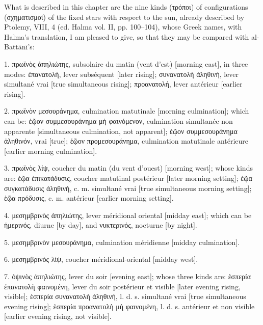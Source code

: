 \documentclass[11pt]{article}
\newcommand{\Pg}[1]{\marginpar{\footnotesize\color{gray}#1}}
\begin{document}
\par What is described in this chapter are the nine kinds ({\greekfont τρόποι}) of configurations ({\greekfont σχηματισμοί}) of the fixed stars with respect to the sun, already described by Ptolemy, VIII, 4 (ed. Halma vol. II, pp. 100–104), whose Greek names, with Halma's translation, I am pleased to give, so that they may be compared with al-Battānī's:\par
\par 1. {\greekfont πρωϊνὸς ἀπηλιώτης}, subsolaire du matin (vent d’est) [morning east], in three modes: {\greekfont ἐπανατολή}, lever subséquent [later rising]; {\greekfont συνανατολὴ ἀληθινή}, lever simultané vrai [true simultaneous rising]; {\greekfont προανατολή}, lever antérieur [earlier rising].\par
\par 2. {\greekfont πρωϊνὸν μεσουράνημα}, culmination matutinale [morning culmination]; which can be: {\greekfont ἑῷον συμμεσουράνημα μὴ φαινόμενον}, culmination simultanée non apparente [simultaneous culmination, not apparent]; {\greekfont ἑῷον συμμεσουράνημα ἀληθινόν}, vrai [true]; {\greekfont ἑῷον προμεσουράνημα}, culmination matutinale antérieure [earlier morning culmination].\par
\par 3. {\greekfont πρωϊνὸς λίψ}, coucher du matin (du vent d’ouest) [morning west]; whose kinds are: {\greekfont ἑῷα ἐπικατάδυσις}, coucher matutinal postérieur [later morning setting]; {\greekfont ἑῷα συγκατάδυσις ἀληθινή}, c. m. simultané vrai [true simultaneous morning setting]; {\greekfont ἑῷα πρόδυσις}, c. m. antérieur [earlier morning setting].\par
\par 4. {\greekfont μεσημβρινὸς ἀπηλιώτης}, lever méridional oriental [midday east]; which can be {\greekfont ἡμερινός}, diurne [by day], and {\greekfont νυκτερινός}, nocturne [by night].\par
\par 5. {\greekfont μεσημβρινὸν μεσουράνημα}, culmination méridienne [midday culmination].\par
\par \Pg{I 285}6. {\greekfont μεσημβρινὸς λίψ}, coucher méridional-oriental [midday west].\par
\par 7. {\greekfont ὀψινὸς ἀπηλιώτης}, lever du soir [evening east]; whose three kinds are: {\greekfont ἑσπερία ἐπανατολὴ φαινομένη}, lever du soir postérieur et visible [later evening rising, visible]; {\greekfont ἑσπερία συνανατολὴ ἀληθινή}, l. d. s. simultané vrai [true simultaneous evening rising]; {\greekfont ἑσπερία προανατολὴ μὴ φαινομένη}, l. d. s. antérieur et non visible [earlier evening rising, not visible].\par
\end{document}
